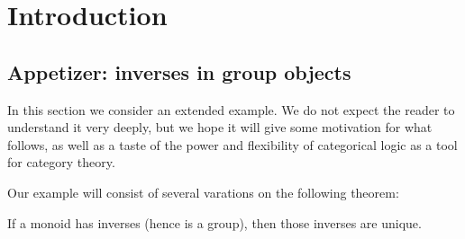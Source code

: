 \chapter{Introduction}
\label{chap:intro}



\section{Appetizer: inverses in group objects}
\label{sec:intro}

In this section we consider an extended example.
We do not expect the reader to understand it very deeply, but we hope it will give some motivation for what follows, as well as a taste of the power and flexibility of categorical logic as a tool for category theory.

Our example will consist of several varations on the following theorem:

\begin{thm}
  If a monoid has inverses (hence is a group), then those inverses are unique.
\end{thm}

